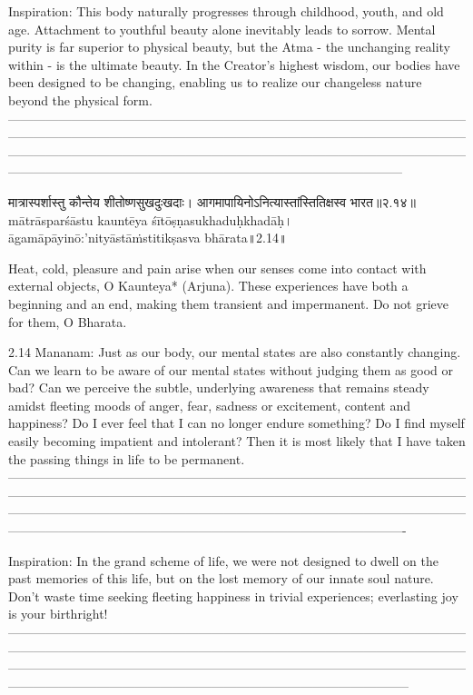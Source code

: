 Inspiration:
This body naturally progresses through childhood, youth, and old age. Attachment to youthful beauty alone inevitably leads to sorrow. Mental purity is far superior to physical beauty, but the Atma - the unchanging reality within - is the ultimate beauty.
In the Creator’s highest wisdom, our bodies have been designed to be changing, enabling us to realize our changeless nature beyond the physical form. 
—------------------------------------------------------------------------------------------------------------------------------------------------------------------------------------------------------------------------------------------------------------------------------------------------------------------------------------------------------------------------------------------------------------------------------


मात्रास्पर्शास्तु कौन्तेय शीतोष्णसुखदुःखदाः। 
आगमापायिनोऽनित्यास्तांस्तितिक्षस्व भारत॥२.१४॥
mātrāsparśāstu kauntēya śītōṣṇasukhaduḥkhadāḥ। 
āgamāpāyinō:'nityāstāṁstitikṣasva bhārata॥2.14॥

Heat, cold, pleasure and pain arise when our senses come into contact with external objects, O Kaunteya* (Arjuna). These experiences have both a beginning and an end, making them transient and impermanent. Do not grieve for them, O Bharata. 

2.14 Mananam:
Just as our body, our mental states are also constantly changing. Can we learn to be aware of our mental states without judging them as good or bad? Can we perceive the subtle, underlying awareness that remains steady amidst fleeting moods of anger, fear, sadness or excitement, content and happiness?
Do I ever feel that I can no longer endure something? Do I find myself easily becoming impatient and intolerant? Then it is most likely that I have taken the passing things in life to be permanent.
—-------------------------------------------------------------------------------------------------------------------------------------------------------------------------------------------------------------------------------------------------------------------------------------------------------------------------------------------------------------------------------------------------------------------------------
 
Inspiration: 
In the grand scheme of life, we were not designed to dwell on the past memories of this life, but on the lost memory of our innate soul nature. Don’t waste time seeking fleeting happiness in trivial experiences; everlasting joy is your birthright!
—--------------------------------------------------------------------------------------------------------------------------------------------------------------------------------------------------------------------------------------------------------------------------------------------------------------------------------------------------------------------------------------------------------------------------------


